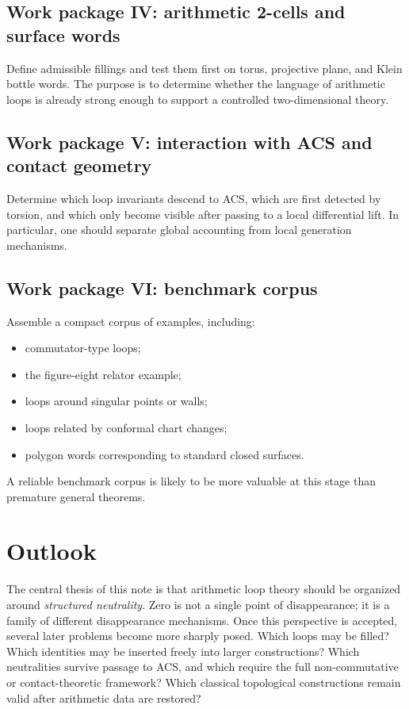 \documentclass[11pt]{article}
\newcommand{\ACS}{ACS}
\begin{document}
\subsection{Work package IV: arithmetic 2-cells and surface words}

Define admissible fillings and test them first on torus, projective plane, and Klein bottle words. The purpose is to determine whether the language of arithmetic loops is already strong enough to support a controlled two-dimensional theory.

\subsection{Work package V: interaction with \ACS{} and contact geometry}

Determine which loop invariants descend to \ACS{}, which are first detected by torsion, and which only become visible after passing to a local differential lift. In particular, one should separate global accounting from local generation mechanisms.

\subsection{Work package VI: benchmark corpus}

Assemble a compact corpus of examples, including:
\begin{itemize}
\item commutator-type loops;
\item the figure-eight relator example;
\item loops around singular points or walls;
\item loops related by conformal chart changes;
\item polygon words corresponding to standard closed surfaces.
\end{itemize}
A reliable benchmark corpus is likely to be more valuable at this stage than premature general theorems.

\section{Outlook}

The central thesis of this note is that arithmetic loop theory should be organized around \emph{structured neutrality}. Zero is not a single point of disappearance; it is a family of different disappearance mechanisms. Once this perspective is accepted, several later problems become more sharply posed. Which loops may be filled? Which identities may be inserted freely into larger constructions? Which neutralities survive passage to \ACS{}, and which require the full non-commutative or contact-theoretic framework? Which classical topological constructions remain valid after arithmetic data are restored?
\end{document}
